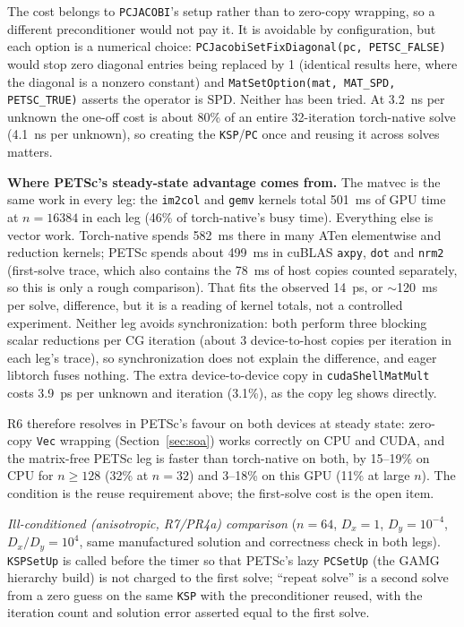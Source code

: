 \documentclass[11pt]{article}
\begin{document}
The cost belongs to \texttt{PCJACOBI}'s setup rather than to zero-copy
wrapping, so a different preconditioner would not pay it. It is avoidable
by configuration, but each option is a numerical choice:
\texttt{PCJacobiSetFixDiagonal(pc, PETSC\_FALSE)} would stop zero diagonal
entries being replaced by 1 (identical results here, where the diagonal is a
nonzero constant) and \texttt{MatSetOption(mat, MAT\_SPD, PETSC\_TRUE)}
asserts the operator is SPD. Neither has been tried. At 3.2~ns per unknown
the one-off cost is about 80\% of an entire 32-iteration torch-native solve
(4.1~ns per unknown), so creating the \texttt{KSP}/\texttt{PC} once and
reusing it across solves matters.

\textbf{Where PETSc's steady-state advantage comes from.} The matvec is the
same work in every leg: the \texttt{im2col} and \texttt{gemv} kernels total
501~ms of GPU time at $n=16384$ in each leg (46\% of torch-native's busy
time). Everything else is vector work. Torch-native spends 582~ms there in
many ATen elementwise and reduction kernels; PETSc spends about 499~ms in
cuBLAS \texttt{axpy}, \texttt{dot} and \texttt{nrm2} (first-solve trace,
which also contains the 78~ms of host copies counted separately, so this
is only a rough comparison). That fits the observed 14~ps, or $\sim$120~ms
per solve, difference, but it is a reading of kernel totals, not a
controlled experiment. Neither leg avoids synchronization: both perform
three blocking scalar reductions per CG iteration (about 3 device-to-host
copies per iteration in each leg's trace), so synchronization does not
explain the difference, and eager libtorch fuses nothing. The extra
device-to-device copy in \texttt{cudaShellMatMult} costs 3.9~ps per unknown
and iteration (3.1\%), as the copy leg shows directly.

R6 therefore resolves in PETSc's favour on both devices at steady state:
zero-copy \texttt{Vec} wrapping (Section~\ref{sec:soa}) works correctly on
CPU and CUDA, and the matrix-free PETSc leg is faster than torch-native on
both, by 15--19\% on CPU for $n\ge128$ (32\% at $n=32$) and 3--18\% on this GPU (11\% at large $n$). The condition is the
reuse requirement above; the first-solve cost is the open item.

\textit{Ill-conditioned (anisotropic, R7/PR4a) comparison} ($n=64$,
$D_x=1$, $D_y=10^{-4}$, $D_x/D_y=10^4$, same manufactured solution and
correctness check in both legs). \texttt{KSPSetUp} is called before the
timer so that PETSc's lazy \texttt{PCSetUp} (the GAMG hierarchy build) is
not charged to the first solve; ``repeat solve'' is a second solve from a
zero guess on the same \texttt{KSP} with the preconditioner reused, with the
iteration count and solution error asserted equal to the first solve.
\end{document}
